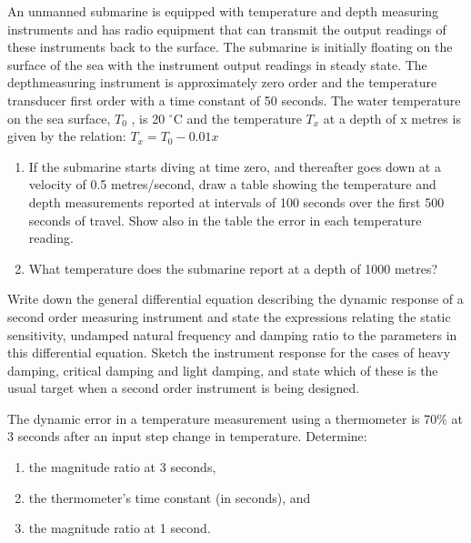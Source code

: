 \documentclass[a4paper,11pt,dvipsnames]{book}
\begin{document}
\begin{question}[subtitle=Example on $1_{\rm st}$-order device]
An unmanned submarine is equipped with temperature and depth measuring instruments
and has radio equipment that can transmit the output readings of these instruments back to
the surface. The submarine is initially floating on the surface of the sea with the instrument
output readings in steady state. The depthmeasuring instrument is approximately zero order
and the temperature transducer first order with a time constant of 50 seconds. The water
temperature on the sea surface, $T_0$ , is 20 $^{\circ}$C and the temperature $T_x$ at a depth of x metres is
given by the relation:
$T_x = T_0 - 0.01x$

\begin{enumerate}
\item If the submarine starts diving at time zero, and thereafter goes down at a velocity of 0.5
metres/second, draw a table showing the temperature and depth measurements reported at
intervals of 100 seconds over the first 500 seconds of travel. Show also in the table the error
in each temperature reading.
\item  What temperature does the submarine report at a depth of 1000 metres?
\end{enumerate}

\examspace*{10em}

\end{question}
\begin{solution}


\end{solution}



\begin{question}
Write down the general differential equation describing the dynamic response of a second
order measuring instrument and state the expressions relating the static sensitivity, undamped
natural frequency and damping ratio to the parameters in this differential equation. Sketch
the instrument response for the cases of heavy damping, critical damping and light damping,
and state which of these is the usual target when a second order instrument is being designed.

\examspace*{40em}

\end{question}
\begin{solution}


\end{solution}


\begin{question}[subtitle=Midterm 2014]
The dynamic error in a temperature measurement using a thermometer is 70\% at 3 seconds
after an input step change in temperature. Determine:
\begin{enumerate}
\item the magnitude ratio at 3 seconds,
\item the thermometer’s time constant (in seconds), and
\item the magnitude ratio at 1 second.
\end{enumerate}
\end{question}
\begin{solution}
\end{solution}
\end{document}

